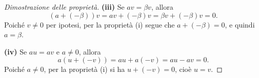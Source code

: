 {\begin{proof}[Dimostrazione delle proprietà]
        \medskip
        \textbf{(iii)} Se \(a v = \beta v\), allora
        \[
            (a + (-\beta))v = a v + (-\beta)v = \beta v + (-\beta)v = 0.
        \]
        Poiché \(v \neq 0\) per ipotesi, per la proprietà (i) segue che \(a + (-\beta) = 0\), e quindi \(a = \beta\).
    
        \medskip
        \textbf{(iv)} Se \(a u = a v\) e \(a \neq 0\), allora
        \[
            a(u + (-v)) = a u + a(-v) = a u - a v = 0.
        \]
        Poiché \(a \neq 0\), per la proprietà (i) si ha \(u + (-v) = 0\), cioè \(u = v\).
    
    \end{proof}
    
        
}
